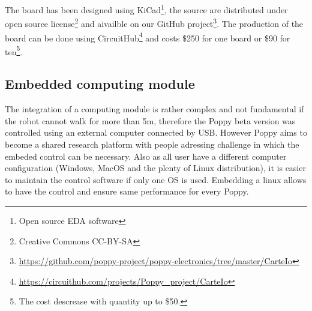 The board has been designed using KiCad\footnote{Open source EDA software}, the source are distributed under open source license\footnote{Creative Commons CC-BY-SA} and aivailble on our GitHub project\footnote{\url{https://github.com/poppy-project/poppy-electronics/tree/master/CarteIo}}. The production of the board can be done using CircuitHub\footnote{\url{https://circuithub.com/projects/Poppy_project/CarteIo}} and costs \$250 for one board or \$90 for ten\footnote{The cost descrease with quantity up to \$50.}.

\begin{figure}[p]
\centering


    \caption{}
    \label{fig:IO-board}
\end{figure}


\subsection{Embedded computing module} %

The integration of a computing module is rather complex and not fundamental if the robot cannot walk for more than 5m, therefore the Poppy beta version was controlled using an external computer connected by USB.
However Poppy aims to become a shared research platform with people adressing challenge in which the embeded control can be necessary. Also as all user have a different computer configuration (Windows, MacOS and the plenty of Linux distribution), it is easier to maintain the control software if only one OS is used. Embedding a linux allows to have the control and ensure same performance for every Poppy.


